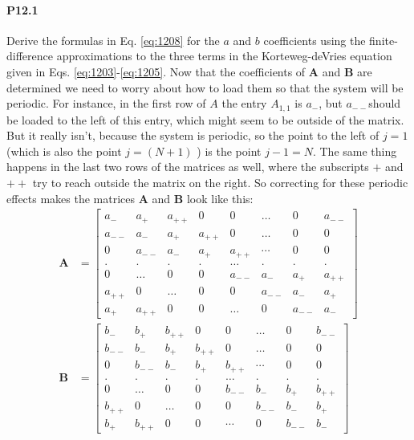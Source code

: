 \paragraph*{P12.1}
Derive the formulas in Eq. \eqref{eq:1208} for the $a$ and $b$ coefficients using the finite-difference approximations to the three terms in the Korteweg-deVries equation given in Eqs. \eqref{eq:1203}-\eqref{eq:1205}.
Now that the coefficients of $\mathbf{A}$ and $\mathbf{B}$ are determined we need to worry about how to load them so that the system will be periodic. For instance, in the first row of $A$ the entry $A_{1,1}$ is $a_{-}$, but $a_{--}$should be loaded to the left of this entry, which might seem to be outside of the matrix. But it really isn\rq t, because the system is periodic, so the point to the left of $j=1$ (which is also the point $j=(N+1)$ ) is the point $j-1=N$. The same thing happens in the last two rows of the matrices as well, where the subscripts $+$ and $++$ try to reach outside the matrix on the right. So correcting for these periodic effects makes the matrices $\mathbf{A}$ and $\mathbf{B}$ look like this:
\begin{equation}\label{eq:1209}
\begin{aligned}
\mathbf{A} &=\left[\begin{array}{cccccccc}
a_{-} & a_{+} & a_{++} & 0 & 0 & \ldots & 0 & a_{--} \\
a_{--} & a_{-} & a_{+} & a_{++} & 0 & \ldots & 0 & 0 \\
0 & a_{--} & a_{-} & a_{+} & a_{++} & \cdots & 0 & 0 \\
. & . & . & . & \ldots & . & . & . \\
0 & \ldots & 0 & 0 & a_{--} & a_{-} & a_{+} & a_{++} \\
a_{++} & 0 & \ldots & 0 & 0 & a_{--} & a_{-} & a_{+} \\
a_{+} & a_{++} & 0 & 0 & \ldots & 0 & a_{--} & a_{-}
\end{array}\right] \\
\mathbf{B} &=\left[\begin{array}{cccccccc}
b_{-} & b_{+} & b_{++} & 0 & 0 & \ldots & 0 & b_{--} \\
b_{--} & b_{-} & b_{+} & b_{++} & 0 & \ldots & 0 & 0 \\
0 & b_{--} & b_{-} & b_{+} & b_{++} & \cdots & 0 & 0 \\
. & . & . & . & \ldots & . & . & . \\
0 & \ldots & 0 & 0 & b_{--} & b_{-} & b_{+} & b_{++} \\
b_{++} & 0 & \ldots & 0 & 0 & b_{--} & b_{-} & b_{+} \\
b_{+} & b_{++} & 0 & 0 & \cdots & 0 & b_{--} & b_{-}
\end{array}\right]
\end{aligned}
\end{equation}

